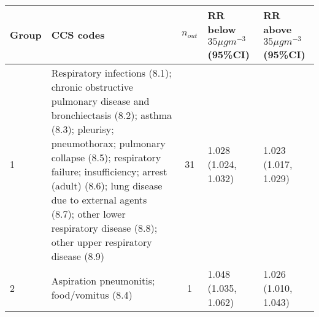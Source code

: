 \begin{tabular}{lp{7.8cm}cp{2.2cm}p{2.2cm}}
  \hline
Group & CCS codes & $n_{out}$ & RR below $35 \mu g m^{-3}$ (95\%CI) & RR above $35 \mu g m^{-3}$ (95\%CI) \\ 
  \hline
   1 & Respiratory infections (8.1); chronic obstructive pulmonary disease and bronchiectasis (8.2); asthma (8.3); pleurisy; pneumothorax; pulmonary collapse (8.5); respiratory failure; insufficiency; arrest (adult) (8.6); lung disease due to external agents (8.7); other lower respiratory disease (8.8); other upper respiratory disease (8.9) &   31 & 1.028 (1.024, 1.032) & 1.023 (1.017, 1.029) \\ 
     2 & Aspiration pneumonitis; food/vomitus (8.4) &    1 & 1.048 (1.035, 1.062) & 1.026 (1.010, 1.043) \\ 
   \hline
\end{tabular}

